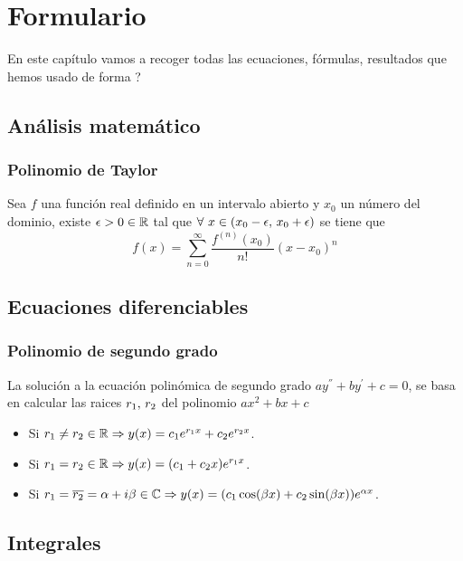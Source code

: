 \chapter{Formulario}\label{ch:formulario}
En este capítulo vamos a recoger todas las ecuaciones, fórmulas, resultados que hemos usado de forma ?

\section{Análisis matemático}\label{sec:analisis-matematico}

\subsection{Polinomio de Taylor}\label{subsec:polinomio-de-taylor}
Sea $f$ una función real definido en un intervalo abierto y $x_0$ un número del dominio, existe $\epsilon>0\in\mathbb{R}$ tal que
$\forall\ x\in(x_0-\epsilon,\thinspace x_0+\epsilon)$ se tiene que
\begin{equation}
    \label{eq:polinomio-taylor}
    f(x)=\sum_{n=0}^{\infty} \frac{f^{(n)}(x_0)}{n !}(x-x_0)^n
\end{equation}

\section{Ecuaciones diferenciables}\label{sec:ecuaciones-diferenciables}
\subsection{Polinomio de segundo grado}\label{subsec:polinomio-de-segundo-grado}
La solución a la ecuación polinómica de segundo grado $ay^{''}+by^{'}+c=0$, se basa en calcular las raices $r_1,\thinspace r_2$ del polinomio
$ax^2+bx+c$
\begin{itemize}
    \item Si $r_1\neq r_2\in\mathbb{R}\Rightarrow y(x)=c_{1}e^{r_{1}x}+c_{2}e^{r_{2}x}$.
    \item Si $r_1= r_2\in\mathbb{R}\Rightarrow y(x)=(c_{1}+c_{2}x)e^{r_{1}x}$.
    \item Si $r_1= \overline{r_2}=\alpha+i\beta\in\mathbb{C}\Rightarrow y(x)=(c_{1}\cos(\beta x)+c_{2}\sin(\beta x))e^{\alpha x}$.
\end{itemize}

\section{Integrales}\label{sec:integrales}
